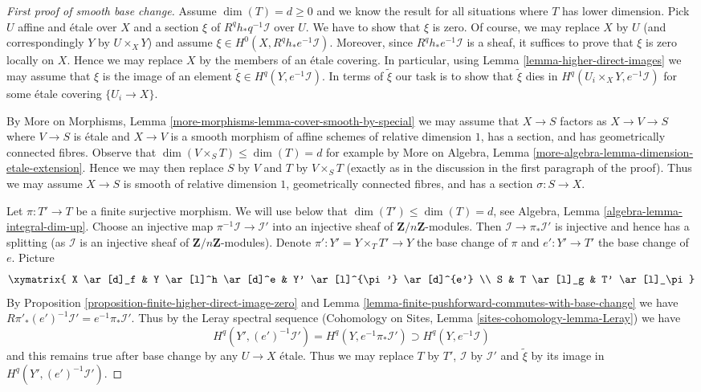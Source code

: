 \begin{proof}[First proof of smooth base change]
\medskip\noindent
Assume $\dim(T) = d \geq 0$ and we know the result for all situations where $T$
has lower dimension. Pick $U$ affine and \'etale over $X$ and a section $\xi$
of $R^qh_*q^{-1}\mathcal{I}$ over $U$. We have to show
that $\xi$ is zero. Of course, we may replace $X$ by $U$
(and correspondingly $Y$ by $U \times_X Y$)
and assume $\xi \in H^0(X, R^qh_*e^{-1}\mathcal{I})$.
Moreover, since $R^qh_*e^{-1}\mathcal{I}$ is a sheaf,
it suffices to prove that $\xi$ is zero locally on $X$.
Hence we may replace $X$ by the members of an \'etale covering.
In particular, using Lemma \ref{lemma-higher-direct-images}
we may assume that $\xi$ is the image of an element
$\tilde \xi \in H^q(Y, e^{-1}\mathcal{I})$.
In terms of $\tilde \xi$ our task is to show that
$\tilde \xi$ dies in $H^q(U_i \times_X Y, e^{-1}\mathcal{I})$
for some \'etale covering $\{U_i \to X\}$.

\medskip\noindent
By More on Morphisms, Lemma \ref{more-morphisms-lemma-cover-smooth-by-special}
we may assume that $X \to S$ factors as $X \to V \to S$
where $V \to S$ is \'etale and $X \to V$ is a smooth morphism
of affine schemes of relative dimension $1$, has a section, and
has geometrically connected fibres. Observe that
$\dim(V \times_S T) \leq \dim(T) = d$
for example by More on Algebra, Lemma
\ref{more-algebra-lemma-dimension-etale-extension}.
Hence we may then replace $S$ by $V$ and $T$ by $V \times_S T$
(exactly as in the discussion in the first paragraph of the proof).
Thus we may assume $X \to S$ is smooth of relative dimension $1$,
geometrically connected fibres, and has a section $\sigma : S \to X$.

\medskip\noindent
Let $\pi : T' \to T$ be a finite surjective morphism.
We will use below that $\dim(T') \leq \dim(T) = d$, see
Algebra, Lemma \ref{algebra-lemma-integral-dim-up}.
Choose an injective map $\pi^{-1}\mathcal{I} \to \mathcal{I}'$
into an injective sheaf of $\mathbf{Z}/n\mathbf{Z}$-modules.
Then $\mathcal{I} \to \pi_*\mathcal{I}'$ is injective
and hence has a splitting (as $\mathcal{I}$ is an injective
sheaf of $\mathbf{Z}/n\mathbf{Z}$-modules).
Denote $\pi' : Y' = Y \times_T T' \to Y$ the base change of $\pi$
and $e' : Y' \to T'$ the base change of $e$. Picture
$$
\xymatrix{
X \ar[d]_f & Y \ar[l]^h \ar[d]^e & Y' \ar[l]^{\pi'} \ar[d]^{e'} \\
S & T \ar[l]_g & T' \ar[l]_\pi
}
$$
By Proposition \ref{proposition-finite-higher-direct-image-zero} and
Lemma \ref{lemma-finite-pushforward-commutes-with-base-change} we have
$R\pi'_*(e')^{-1}\mathcal{I}' = e^{-1}\pi_*\mathcal{I}'$.
Thus by the Leray spectral sequence
(Cohomology on Sites, Lemma \ref{sites-cohomology-lemma-Leray})
we have
$$
H^q(Y', (e')^{-1}\mathcal{I}') =
H^q(Y, e^{-1}\pi_*\mathcal{I}') \supset H^q(Y, e^{-1}\mathcal{I})
$$
and this remains true after base change by any $U \to X$ \'etale.
Thus we may replace $T$ by $T'$, $\mathcal{I}$ by $\mathcal{I}'$
and $\tilde \xi$ by its image in $H^q(Y', (e')^{-1}\mathcal{I}')$.


\end{proof}
